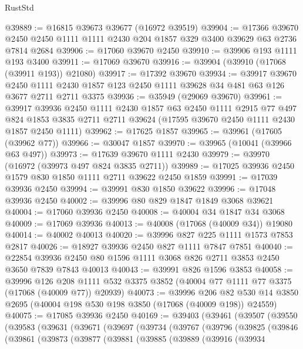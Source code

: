 \begin{lexlean}{RustStd}
\begin{coremodule}
@39889 := @16815 @39673 @39677 (@16972 @39519)
@39904 := @17366
    @39670
    @2450
    @2450
    @1111
    @1111
    @2430
    @204
    @1857
    @329
    @3400
    @39629
    @63
    @2736
    @7814
    @2684
@39906 := @17060 @39670 @2450
@39910 := @39906 @193 @1111 @193 @3400
@39911 := @17069 @39670
@39916 := @39904 (@39910 (@17068 (@39911 @193)) @21080)
@39917 := @17392 @39670
@39934 := @39917
    @39670
    @2450
    @1111
    @2430
    @1857
    @123
    @2450
    @1111
    @39628
    @34
    @481
    @63
    @126
    @3677
    @2711
    @2711
    @3375
@39936 := @35949 (@29069 @39670)
@39961 := @39917
    @39936
    @2450
    @1111
    @2430
    @1857
    @63
    @2450
    @1111
    @2915
    @77
    @497
    @824
    @1853
    @3835
    @2711
    @2711
    @39624
    (@17595 @39670 @2450 @1111 @2430 @1857 @2450 @1111)
@39962 := @17625 @1857
@39965 := @39961 (@17605 (@39962 @77))
@39966 := @30047 @1857
@39970 := @39965 (@10041 (@39966 @63 @497))
@39973 := @17639 @39670 @1111 @2430
@39979 := @39970 (@16972 (@39973 @497 @824 @3835 @2711))
@39989 := @17025 @39936 @2450 @1579 @830 @1850 @1111 @2711 @39622 @2450 @1859
@39991 := @17039 @39936 @2450
@39994 := @39991 @830 @1850 @39622
@39996 := @17048 @39936 @2450
@40002 := @39996 @80 @829 @1847 @1849 @3068 @39621
@40004 := @17060 @39936 @2450
@40008 := @40004 @34 @1847 @34 @3068
@40009 := @17069 @39936
@40013 := @40008 (@17068 (@40009 @34)) @19080
@40014 := @40002 @40013
@40020 := @39996 @827 @225 @1111 @1573 @7853 @2817
@40026 := @18927 @39936 @2450 @827 @1111 @7847 @7851
@40040 := @22854 @39936 @2450 @80 @1596 @1111 @3068 @826 @2711 @3853 @2450 @3650 @7839 @7843 @40013
@40043 := @39991 @826 @1596 @3853
@40058 := @39996
    @126
    @208
    @1111
    @532
    @3375
    @3852
    (@40004 @77 @1111 @77 @3375 (@17068 (@40009 @77)) @20939)
@40073 := @39996
    @206
    @82
    @530
    @14
    @3850
    @2695
    (@40004 @198 @530 @198 @3850 (@17068 (@40009 @198)) @24559)
@40075 := @17085 @39936 @2450
@40169 := @39403
    (@39461
      (@39507
        (@39550
          (@39583
            (@39631
              (@39671
                (@39697
                  (@39734
                    (@39767
                      (@39796
                        (@39825
                          (@39846
                            (@39861
                              (@39873
                                (@39877
                                  (@39881
                                    (@39885
                                      (@39889
                                        (@39916
                                          (@39934

\end{coremodule}
\end{lexlean}
